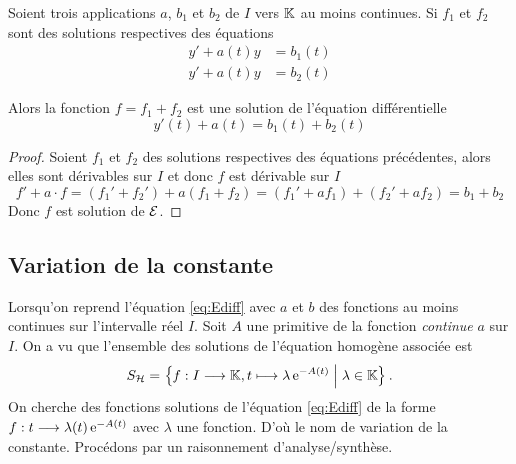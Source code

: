 \begin{prop}
  Soient trois applications \(a\), \(b_1\) et \(b_2\) de \(I\) vers \(\mathbb{K}\) au
  moins continues. Si \(f_1\) et \(f_2\) sont des solutions respectives des
  équations
  \begin{align}
    y' + a(t)y& = b_1(t)\\
    y' + a(t)y& = b_2(t)
  \end{align}

  Alors la fonction \(f = f_1 + f_2\) est une solution de l'équation différentielle
  \begin{equation}
    y'(t) + a(t) = b_1(t) + b_2(t)
  \end{equation}
\end{prop}
\begin{proof}
  Soient \(f_1\) et \(f_2\) des solutions respectives des équations
  précédentes, alors elles sont dérivables sur \(I\) et donc \(f\) est
  dérivable sur \(I\)
  \begin{equation}
    f' + a \cdot f = (f_1' + f_2') + a(f_1 + f_2) = (f_1' + af_1) + (f_2' +
    af_2) = b_1 + b_2
  \end{equation}
  Donc \(f\) est solution de \(\mathcal{E}\).
\end{proof}

\subsection{Variation de la constante}
\label{subsec:variationdelaconstante}

Lorsqu'on reprend l'équation \eqref{eq:Ediff} avec \(a\) et \(b\) des
fonctions au moins continues sur l'intervalle réel \(I\). Soit \(A\) une
primitive de la fonction \emph{continue} \(a\) sur \(I\). On a vu que
l'ensemble des solutions de l'équation homogène associée est
\begin{equation}
  S_{\mathcal{H}} = \left\{f:I \longrightarrow{} \mathbb{K}, t \longmapsto{} \lambda \operatorname{e}^{-A(t)}\mathrel{}\middle|\mathrel{}\lambda \in
  \mathbb{K}\right\}.
\end{equation}
On cherche des fonctions solutions de l'équation \eqref{eq:Ediff} de la
forme \(f:t \longrightarrow{} \lambda(t)\operatorname{e}^{-A(t)}\) avec \(\lambda\) une
fonction. D'où le nom de variation de la constante. Procédons par un
raisonnement d'analyse/synthèse.

